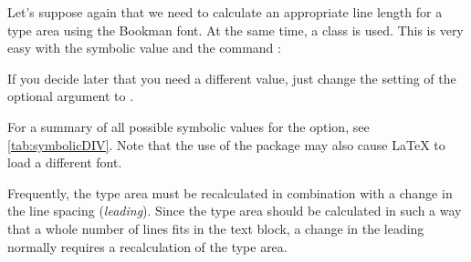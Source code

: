 \begin{Example}
  Let's suppose again that we need to calculate an appropriate line length for
  a type area using the Bookman font. At the same time, a {\KOMAScript} class
  is used. This is very easy with the symbolic value  and the
  command :
  If you decide later that you need a different  value, just
  change the setting of the optional argument to
  .
\end{Example}

For a summary of all possible symbolic values for the  option, see
\autoref{tab:symbolicDIV}. Note that the use of the
 package may also cause \LaTeX{} to
load a different font.

\begin{table}
  \caption[{%
  	Symbolic values for the  option and the
  	 argument to %
  }]{%
    Available symbolic values for the  option or
    the  argument to
  }
  \label{tab:symbolicDIV}
  \begin{desctabular}
  \end{desctabular}
\end{table}

Frequently, the type area must be recalculated in
combination with a change in the line spacing (\emph{leading}).
Since the type area should be calculated in such a way that a whole number of
lines fits in the text block, a change in the leading normally requires a
recalculation of the type area.
 
